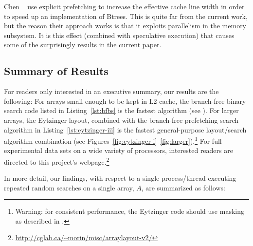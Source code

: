 \documentclass{patmorin}
\newcommand{\lstref}[1]{Listing~\ref{lst:#1}}
\begin{document}
Chen \etal\ \cite{chen.gibbons.ea:improving} use explicit prefetching
to increase the effective cache line width in order to speed up an
implementation of Btrees.  This is quite far from the current work, but
the reason their approach works is that it exploits parallelism in the
memory subsystem.  It is this effect (combined with speculative execution)
that causes some of the surprisingly results in the current paper.

\subsection{Summary of Results}

For readers only interested in an executive summary, our results
are the following: For arrays small enough to be kept in L2 cache,
the branch-free binary search code listed in \lstref{bfbs} is
the fastest algorithm (see ).  For larger
arrays, the Eytzinger layout, combined with the branch-free
prefetching search algorithm in \lstref{eytzinger-iii} is the
fastest general-purpose layout/search algorithm combination (see
Figures~\ref{fig:eytzinger-i}--\ref{fig:larger}).\footnote{Warning:
for consistent performance, the Eytzinger code should
use masking as described in .}
For full experimental data sets on a wide variety of
processors, interested readers are directed to this project's
webpage.\footnote{\url{http://cglab.ca/~morin/misc/arraylayout-v2/}}

In more detail, our findings, with respect to a single process/thread
executing repeated random searches on a single array, $A$, are summarized
as follows:
\end{document}
